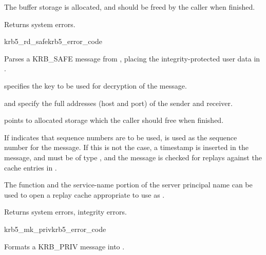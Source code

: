 The  buffer storage is allocated, and should be freed by the
caller when finished.

Returns system errors.

\begin{funcdecl}{krb5_rd_safe}{krb5_error_code}{\funcin}
\funcinout
{}
\funcout
{}
\end{funcdecl}

Parses a KRB_SAFE message from , placing the
integrity-protected user data in .

 specifies the key to be used for decryption of the message.
 
 and  specify the full
addresses (host and port) of the sender and receiver.

 points to allocated storage which the caller should
free when finished.

If  indicates that sequence numbers are to be
used,  is used as the sequence number for the
message.  If this is not the case, a timestamp is inserted in the
message, and  must be of type
, and the message is checked for replays
against the cache entries in .

The function  and the service-name
portion of the server principal name can be used to open a
replay cache appropriate to use as .

Returns system errors, integrity errors.

\begin{funcdecl}{krb5_mk_priv}{krb5_error_code}{\funcin}
\funcinout
{}
\funcout
{}
\end{funcdecl}

Formats a KRB_PRIV message into .

